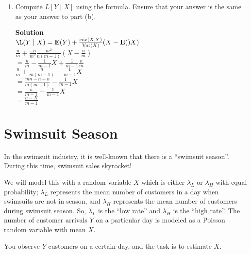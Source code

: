 \documentclass[11pt]{article}
\newcommand*{\Question}[1]{\section{#1}}
\newenvironment{Parts}{\begin{enumerate}[label=(\alph*)]}{\end{enumerate}}
\newcommand*{\Part}{\item}
\newenvironment{Answer}{\vspace{10pt}\begin{mdframed}\textbf{Solution}\\}{\end{mdframed}\vfill\pagebreak[3]}
\newenvironment{Answer}{\vspace{10pt}}{\vfill\pagebreak[3]}
\newcommand*{\E}{\textbf{E}}
\newcommand*{\Var}[1]{\text{Var}(#1)}
\newcommand*{\cov}[1]{\text{cov}(#1)}
\begin{document}
\begin{Parts}
  \Part Compute $L[Y \mid X]$ using the formula. Ensure that your answer is the same as your answer to part (b).
  \begin{Answer}
$\L(Y \mid X)=\E(Y)+\frac{\cov{X,Y}}{\Var{X}}(X-\E()X)$\\
$\frac{n}{m}+\frac{-n}{m^2}\frac{m^2}{n(m-1)}(X-\frac{n}{m})$\\
$=\frac{n}{m}-\frac{1}{m-1}X+\frac{1}{m-1}\frac{n}{m}$\\
$\frac{n}{m}+\frac{n}{m(m-1)}-\frac{1}{m-1}X$\\
$=\frac{mn-n+n}{m(m-1)}-\frac{1}{m-1}X$\\
$=\frac{n}{m-1}-\frac{1}{m-1}X$\\
$=\frac{n-X}{m-1}$
  \end{Answer}
\end{Parts}


\Question{Swimsuit Season}

In the swimsuit industry, it is well-known that there is a ``swimsuit season''. During this time, swimsuit sales skyrocket!

We will model this with a random variable $X$ which is either $\lambda_L$ or $\lambda_H$ with equal probability; $\lambda_L$ represents the mean number of customers in a day when swimsuits are not in season, and $\lambda_H$ represents the mean number of customers during swimsuit season. So, $\lambda_L$ is the ``low rate'' and $\lambda_H$ is the ``high rate''. The number of customer arrivals $Y$ on a particular day is modeled as a Poisson random variable with mean $X$.

You observe $Y$ customers on a certain day, and the task is to estimate $X$.
\end{document}
